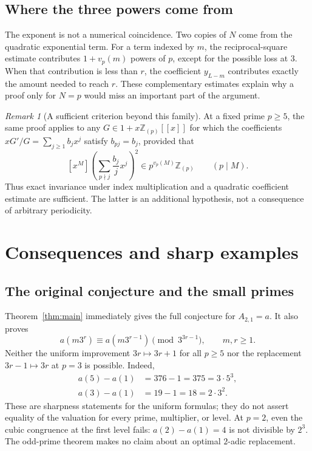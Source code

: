 \documentclass[11pt,a4paper]{article}
\numberwithin{equation}{section}
\theoremstyle{definition}
\theoremstyle{remark}
\newtheorem{remark}[remark]{Remark}
\newcommand{\Z}{\mathbb Z}
\newcommand{\Zp}{\Z_{(p)}}
\newcommand{\vp}{v_p}
\begin{document}
\subsection{Where the three powers come from}

The exponent is not a numerical coincidence. Two copies of $N$ come
from the quadratic exponential term. For a term indexed by $m$, the
reciprocal-square estimate contributes $1+\vp(m)$ powers of $p$, except
for the possible loss at $3$. When that contribution is less than $r$,
the coefficient $y_{L-m}$ contributes exactly the amount needed to
reach $r$. These complementary estimates explain why a proof only for
$N=p$ would miss an important part of the argument.

\begin{remark}[A sufficient criterion beyond this family]\label{rem:criterion}
At a fixed prime $p\geq5$, the same proof applies to any
$G\in1+x\Zp[[x]]$ for which the coefficients
$xG'/G=\sum_{j\geq1}b_jx^j$ satisfy $b_{pj}=b_j$, provided that
\[
 [x^M]\left(\sum_{p\nmid j}\frac{b_j}{j}x^j\right)^2
 \in p^{\vp(M)}\Zp\qquad(p\mid M).
\]
Thus exact invariance under index multiplication and a quadratic
coefficient estimate are sufficient. The latter is an additional
hypothesis, not a consequence of arbitrary periodicity.
\end{remark}

\section{Consequences and sharp examples}\label{sec:consequences}

\subsection{The original conjecture and the small primes}

Theorem~\ref{thm:main} immediately gives the full conjecture for
$A_{2,1}=a$. It also proves
\begin{equation}\label{eq:three-adic}
 a(m3^r)\equiv a(m3^{r-1})\pmod{3^{3r-1}},\qquad m,r\geq1.
\end{equation}
Neither the uniform improvement $3r\mapsto3r+1$ for all $p\geq5$ nor
the replacement $3r-1\mapsto3r$ at $p=3$ is possible. Indeed,
\begin{align*}
 a(5)-a(1)&=376-1=375=3\cdot5^3,\\
 a(3)-a(1)&=19-1=18=2\cdot3^2.
\end{align*}
These are sharpness statements for the uniform formulas; they do not
assert equality of the valuation for every prime, multiplier, or level.
At $p=2$, even the cubic congruence at the first level fails:
$a(2)-a(1)=4$ is not divisible by $2^3$. The odd-prime theorem makes no
claim about an optimal $2$-adic replacement.
\end{document}

